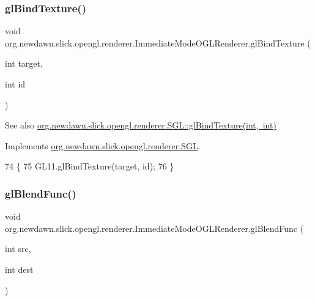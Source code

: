 \subsubsection{\texorpdfstring{gl\+Bind\+Texture()}{glBindTexture()}}
{\footnotesize\ttfamily void org.\+newdawn.\+slick.\+opengl.\+renderer.\+Immediate\+Mode\+O\+G\+L\+Renderer.\+gl\+Bind\+Texture (\begin{DoxyParamCaption}\item[{int}]{target,  }\item[{int}]{id }\end{DoxyParamCaption})\hspace{0.3cm}{\ttfamily [inline]}}

\begin{DoxySeeAlso}{See also}
\mbox{\hyperlink{interfaceorg_1_1newdawn_1_1slick_1_1opengl_1_1renderer_1_1_s_g_l_a7b546bba69c511f7d96d055ac1ed6a21}{org.\+newdawn.\+slick.\+opengl.\+renderer.\+S\+G\+L\+::gl\+Bind\+Texture(int, int)}} 
\end{DoxySeeAlso}


Implements \mbox{\hyperlink{interfaceorg_1_1newdawn_1_1slick_1_1opengl_1_1renderer_1_1_s_g_l_a7b546bba69c511f7d96d055ac1ed6a21}{org.\+newdawn.\+slick.\+opengl.\+renderer.\+S\+GL}}.


\begin{DoxyCode}
74                                                   \{
75         GL11.glBindTexture(target, \textcolor{keywordtype}{id});
76     \}
\end{DoxyCode}
\mbox{\label{classorg_1_1newdawn_1_1slick_1_1opengl_1_1renderer_1_1_immediate_mode_o_g_l_renderer_af241eb86655622bc19f902ff4dd2033d}} 
\subsubsection{\texorpdfstring{gl\+Blend\+Func()}{glBlendFunc()}}
{\footnotesize\ttfamily void org.\+newdawn.\+slick.\+opengl.\+renderer.\+Immediate\+Mode\+O\+G\+L\+Renderer.\+gl\+Blend\+Func (\begin{DoxyParamCaption}\item[{int}]{src,  }\item[{int}]{dest }\end{DoxyParamCaption})\hspace{0.3cm}{\ttfamily [inline]}}

